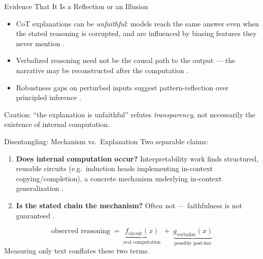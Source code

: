 \documentclass[aspectratio=169,11pt]{beamer}
\begin{document}
\begin{frame}{Evidence That It Is a Reflection or an Illusion}
  \begin{itemize}
    \item CoT explanations can be \emph{unfaithful}: models reach the same answer even when the stated reasoning is corrupted, and are influenced by biasing features they never mention \citep{turpin2023language}.
    \item Verbalized reasoning need not be the causal path to the output --- the narrative may be reconstructed after the computation \citep{turpin2023language}.
    \item Robustness gaps on perturbed inputs suggest pattern-reflection over principled inference \citep{mccoy2019right}.
  \end{itemize}
  \alert{Caution}: ``the explanation is unfaithful'' refutes \emph{transparency}, not necessarily the existence of internal computation.
\end{frame}

\begin{frame}{Disentangling: Mechanism vs.\ Explanation}
  Two separable claims:
  \begin{enumerate}
    \item \textbf{Does internal computation occur?} Interpretability work finds structured, reusable circuits (e.g.\ induction heads implementing in-context copying/completion), a concrete mechanism underlying in-context generalization \citep{olsson2022incontext}.
    \item \textbf{Is the stated chain the mechanism?} Often not --- faithfulness is not guaranteed \citep{turpin2023language}.
  \end{enumerate}
  \[
    \text{observed reasoning} \;=\; \underbrace{f_{\text{circuit}}(x)}_{\text{real computation}} \;+\; \underbrace{g_{\text{verbalize}}(x)}_{\text{possibly post-hoc}}
  \]
  Measuring only text conflates these two terms.
\end{frame}
\end{document}
